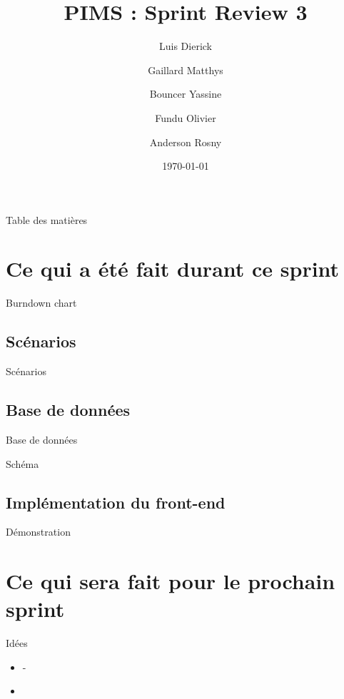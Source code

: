 \documentclass[numbering=fraction]{beamer}
\title{PIMS : Sprint Review 3}
\author[PIMS]{Luis Dierick \and Gaillard Matthys \and Bouncer Yassine \and Fundu Olivier \and Anderson Rosny }
\institute{Université de Namur}
\date{\today}
\begin{document}
\begin{frame}[plain]{}
    \maketitle
\end{frame}

\begin{frame}{Table des matières}
    \tableofcontents
\end{frame}

\section{Ce qui a été fait durant ce sprint}

\begin{frame}{Burndown chart}
    
\end{frame}

\subsection{Scénarios}
\begin{frame}{Scénarios}
    
\end{frame}

\subsection{Base de données}
\begin{frame}{Base de données}
    
\end{frame}

\begin{frame}{Schéma}
    
\end{frame}

\subsection{Implémentation du front-end}
\begin{frame}{Démonstration}
    
\end{frame}

\section{Ce qui sera fait pour le prochain sprint}
\begin{frame}{Idées}
    \begin{itemize}
        \item -
        \item 
    \end{itemize}
\end{frame}
\end{document}

